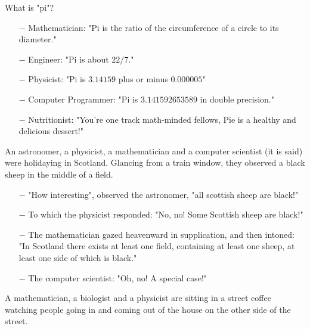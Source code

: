 What is "pi"?

\begin{itemize}	 
	\item[$-$] Mathematician: "Pi is the ratio of the circumference of a circle to its diameter."

	\item[$-$] Engineer: "Pi is about $22/7$."

	\item[$-$] Physicist: "Pi is $3.14159$ plus or minus $0.000005$"

	\item[$-$] Computer Programmer: "Pi is $3.141592653589$ in double precision."

	\item[$-$] Nutritionist: "You're one track math-minded fellows, Pie is a healthy and delicious dessert!"
\end{itemize}
	\begin{center}\underline{\hspace{5 cm}}\end{center}
	
An astronomer, a physicist, a mathematician and a computer scientist (it is said) were holidaying in Scotland. Glancing from a train window, they observed a black sheep in the middle of a field. 

\begin{itemize}	 
	\item[$-$] "How interesting", observed the astronomer, "all scottish sheep are black!" 

	\item[$-$] To which the physicist responded: "No, no! Some Scottish sheep are black!" 

	\item[$-$] The mathematician gazed heavenward in supplication, and then intoned: "In Scotland there exists at least one field, containing at least one sheep, at least one side of which is black."

	\item[$-$] The computer scientist: "Oh, no! A special case!"	
	
\end{itemize}
	\begin{center}\underline{\hspace{5 cm}}\end{center}	
	
A mathematician, a biologist and a physicist are sitting in a street coffee watching people going in and coming out of the house on the other side of the street. 

